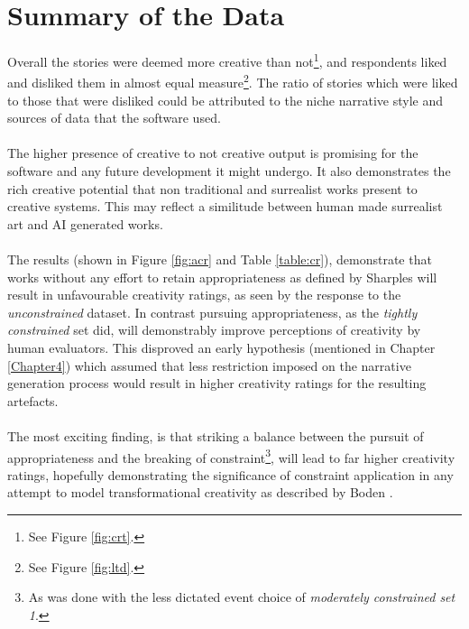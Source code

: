 \documentclass[letterpaper]{article}
\begin{document}
\section{Summary of the Data}
Overall the stories were deemed more creative than not\footnote{See Figure \ref{fig:crt}.}, and respondents liked and disliked them in almost equal measure\footnote{See Figure \ref{fig:ltd}.}. The ratio of stories which were liked to those that were disliked could be attributed to the niche narrative style and sources of data that the software used.\\
\\The higher presence of creative to not creative output is promising for the software and any future development it might undergo. It also demonstrates the rich creative potential that non traditional and surrealist works present to creative systems. This may reflect a similitude between human made surrealist art and AI generated works.\\ 
\\The results (shown in Figure \ref{fig:acr} and Table \ref{table:cr}), demonstrate that works without any effort to retain appropriateness as defined by Sharples  will result in unfavourable creativity ratings, as seen by the response to the \emph{unconstrained} dataset. In contrast pursuing appropriateness, as the \emph{tightly constrained} set did, will demonstrably improve perceptions of creativity by human evaluators. This disproved an early hypothesis (mentioned in Chapter \ref{Chapter4}) which assumed that less restriction imposed on the narrative generation process would result in higher creativity ratings for the resulting artefacts.\\ 
\\The most exciting finding, is that striking a balance between the pursuit of appropriateness and the breaking of constraint\footnote{As was done with the less dictated event choice of \emph{moderately constrained set 1}.}, will lead to far higher creativity ratings, hopefully demonstrating the significance of constraint application in any attempt to model transformational creativity as described by Boden .
\end{document}
